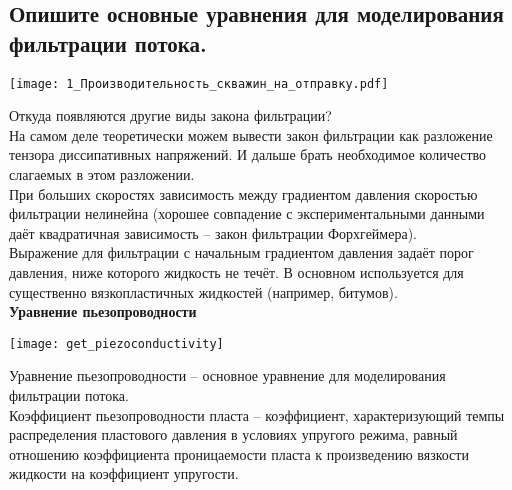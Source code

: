 

\subsection{Опишите основные уравнения для моделирования фильтрации потока.}

\texttt{[image: 1\_Производительность\_скважин\_на\_отправку.pdf]}

Откуда появляются другие виды закона фильтрации?
\\

На самом деле теоретически можем вывести закон фильтрации как разложение тензора диссипативных напряжений.
И дальше брать необходимое количество слагаемых в этом разложении.
\\

При больших скоростях зависимость между градиентом давления скоростью фильтрации нелинейна (хорошее совпадение с экспериментальными данными даёт квадратичная зависимость -- закон фильтрации Форхгеймера).
\\

Выражение для фильтрации с начальным градиентом давления задаёт порог давления, ниже которого жидкость не течёт.
В основном используется для существенно вязкопластичных жидкостей (например, битумов).
\\

\textbf{Уравнение пьезопроводности}

\texttt{[image: get\_piezoconductivity]}

Уравнение пьезопроводности -- основное уравнение для моделирования фильтрации потока.
\\

Коэффициент пьезопроводности пласта -- коэффициент, характеризующий темпы распределения пластового давления в условиях упругого режима, равный отношению коэффициента проницаемости пласта к произведению вязкости жидкости на коэффициент упругости.

